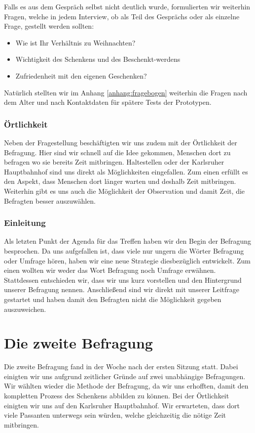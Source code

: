 \documentclass[12pt,ngerman, fleqn]{book} %
\begin{document}
Falls es aus dem Gespräch selbst nicht deutlich wurde, formulierten wir weiterhin Fragen, welche in jedem Interview, ob als Teil des Gesprächs oder als einzelne Frage, gestellt werden sollten:

\begin{itemize}
    \item Wie ist Ihr Verhältnis zu Weihnachten?
    \item Wichtigkeit des Schenkens und des Beschenkt-werdens
    \item Zufriedenheit mit den eigenen Geschenken?
\end{itemize}

Natürlich stellten wir im Anhang \ref{anhang:fragebogen} weiterhin die Fragen nach dem Alter und nach Kontaktdaten für spätere Tests der Prototypen.

\subsubsection{Örtlichkeit}
Neben der Fragestellung beschäftigten wir uns zudem mit der Örtlichkeit der Befragung. Hier sind wir schnell auf die Idee gekommen, Menschen dort zu befragen wo sie bereits Zeit mitbringen. Haltestellen oder der Karlsruher Hauptbahnhof sind uns direkt als Möglichkeiten eingefallen. Zum einen erfüllt es den Aspekt, dass Menschen dort länger warten und deshalb Zeit mitbringen. Weiterhin gibt es uns auch die Möglichkeit der Observation und damit Zeit, die Befragten besser auszuwählen.

\subsubsection{Einleitung}
Als letzten Punkt der Agenda für das Treffen haben wir den Begin der Befragung besprochen. Da uns aufgefallen ist, dass viele nur ungern die Wörter Befragung oder Umfrage hören, haben wir eine neue Strategie diesbezüglich entwickelt. Zum einen wollten wir weder das Wort Befragung noch Umfrage erwähnen. Stattdessen entschieden wir, dass wir uns kurz vorstellen und den Hintergrund unserer Befragung nennen. Anschließend sind wir direkt mit unserer Leitfrage gestartet und haben damit den Befragten nicht die Möglichkeit gegeben auszuweichen.

\section{Die zweite Befragung}
Die zweite Befragung fand in der Woche nach der ersten Sitzung statt. Dabei einigten wir uns aufgrund zeitlicher Gründe auf zwei unabhängige Befragungen. Wir wählten wieder die Methode der Befragung, da wir uns erhofften, damit den kompletten Prozess des Schenkens abbilden zu können. Bei der Örtlichkeit einigten wir uns auf den Karlsruher Hauptbahnhof. Wir erwarteten, dass dort viele Passanten unterwegs sein würden, welche gleichzeitig die nötige Zeit mitbringen.
\end{document}
